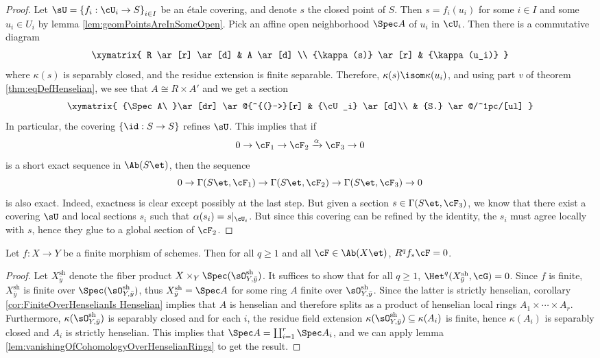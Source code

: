 \begin{proof}
Let $\sU = \left\{f_i : \cU_i \to S \right\}_{i\in I}$ be an \'etale covering, and denote $s$ the closed point of $S$. Then $s = f_i (u_i)$ for some $i\in I$ and some $u_i \in U_i$ by lemma \ref{lem:geomPointsAreInSomeOpen}. Pick an affine open neighborhood $\Spec A$ of $u_i$ in $\cU_i$. Then there is a commutative diagram
$$
\xymatrix{
R \ar[r] \ar[d] & A \ar[d] \\
{\kappa(s)} \ar[r] & {\kappa(u_i)}
}
$$
where $\kappa(s)$ is separably closed, and the residue extension is finite separable. Therefore, $\kappa(s) \isom \kappa(u_i)$, and using part {\it v} of theorem \ref{thm:eqDefHenselian}, we see that $A \cong R\times A'$ and we get a section
$$
\xymatrix{
{\Spec A\ }\ar[dr] \ar@{^{(}->}[r] & {\cU_i} \ar[d]\\
& {S.} \ar@/^1pc/[ul]
}
$$
In particular, the covering $\left\{\id : S\to S\right\}$ refines $\sU$. This implies that if 
$$
0 \to \cF_1\to \cF_2 \xrightarrow{\alpha} \cF_3\to 0
$$
is a short exact sequence in $\Ab(S\et)$, then the sequence
$$
0 \to \Gamma(S\et, \cF_1) \to \Gamma(S\et, \cF_2) \to \Gamma(S\et, \cF_3)\to 0
$$
is also exact. Indeed, exactness is clear except possibly at the last step. But given a section $s \in \Gamma(S\et, \cF_3)$, we know that there exist a covering $\sU$ and local sections $s_i$ such that $\alpha (s_i) = s|_{\cU_i}$. But since this covering can be refined by the identity, the $s_i$ must agree locally with $s$, hence they glue to a global section of $\cF_2$.
\end{proof}

\begin{prop} \label{prop:FiniteHigherDirectImagesVanish}
Let $f: X\to Y$ be a finite morphism of schemes. Then for all $q\geqslant 1$ and all $\cF\in \Ab(X\et)$, $R^q f_*\cF=0$. 
\end{prop}

\begin{proof}
Let $X_{\bar y}^\text{sh}$ denote the fiber product $X\times_Y \Spec(\sO_{Y, \bar y}^\text{sh})$. It suffices to show that for all $q\geqslant 1$, $\Het^q(X_{\bar y}^\text{sh}, \cG)=0$. Since $f$ is finite, $X_{\bar y}^\text{sh}$ is finite over $\Spec(\sO_{Y, \bar y}^\text{sh})$, thus $X_{\bar y}^\text{sh} = \Spec A$ for some ring $A$ finite over $\sO_{Y, \bar y}^\text{sh}$. Since the latter is strictly henselian, corollary \ref{cor:FiniteOverHenselianIs Henselian} implies that $A$ is henselian and therefore splits as a product of henselian local rings $A_1 \times \cdots \times A_r$. Furthermore, $\kappa(\sO_{Y, \bar y}^\text{sh})$ is separably closed and for each $i$, the residue field extension $\kappa(\sO_{Y, \bar y}^\text{sh}) \subseteq \kappa(A_i)$ is finite, hence $\kappa(A_i)$ is separably closed  and $A_i$ is strictly henselian. This implies that $\Spec A = \coprod_{i=1}^r \Spec A_i$, and we can apply lemma \ref{lem:vanishingOfCohomologyOverHenselianRings} to get the result.
\end{proof}

